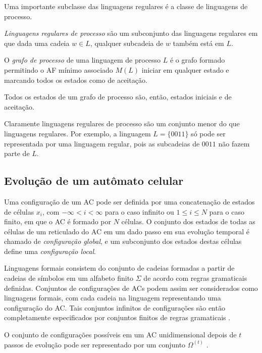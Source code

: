 \documentclass[12pt,a4paper]{article}
\newenvironment{definition}[1][Definição]{\begin{trivlist}
\item[\hskip \labelsep {\bfseries #1}]}{\end{trivlist}}
\begin{document}
Uma importante subclasse das linguagens regulares é a classe de linguagens
de processo. 

\begin{definition}
\textit{Linguagens regulares de processo} são um subconjunto das linguagens regulares
em que dada uma cadeia $w \in L$, qualquer subcadeia de $w$ também
está em $L$.
\end{definition}

\begin{definition}
O \textit{grafo de processo} de uma linguagem de processo $L$ é o grafo
formado permitindo o AF mínimo associado $M(L)$ iniciar em qualquer
estado e marcando todos os estados como de aceitação.
\end{definition}

Todos os estados de um grafo de processo são, então, estados iniciais e de
aceitação.

Claramente linguagens regulares de processo são um conjunto menor do que
linguagens regulares. Por exemplo, a linguagem $L = \{0011\}$ só pode ser
representada por uma linguagem regular, pois as subcadeias de $0011$ não
fazem parte de $L$.

\subsection{Evolução de um autômato celular}

Uma configuração de um AC pode ser definida por uma concatenação de estados
de células $x_i$, com $-\infty < i < \infty$ para o caso infinito ou
$1 \le i \le N$ para o caso finito, em que o AC é formado por $N$ células.
O conjunto dos estados de todas as células
de um reticulado do AC em um dado passo em sua evolução temporal é chamado de
\textit{configuração global}, e um subconjunto dos estados destas
células define uma \textit{configuração local}.

Linguagens formais consistem do conjunto de cadeias formadas a partir de
cadeias de símbolos em um alfabeto finito $\Sigma$ de acordo com regras
gramaticais definidas. Conjuntos de configurações de ACs
podem assim ser considerados como linguagens formais, com cada cadeia na
linguagem representando uma configuração do AC. Tais conjuntos
infinitos de configurações são então completamente especificados por
conjuntos finitos de regras gramaticais .

O conjunto de configurações possíveis em um AC unidimensional depois de $t$
passos de evolução pode ser representado por um conjunto $\Omega^{(t)}$
.
\end{document}
